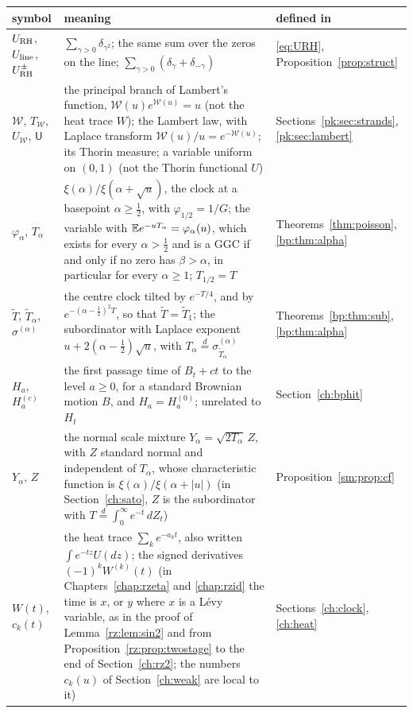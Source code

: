{\small
\begin{longtable}{@{}p{}p{}p{}@{}}
\toprule
symbol & meaning & defined in\\
\midrule
\endhead
$U_{\mathrm{RH}}$, $U_{\rm line}$, $U^\pm_{\mathrm{RH}}$ & \raggedright $\sum_{\gamma>0}\delta_{\gamma^2}$; the same sum over the zeros on the line; ${\sum_{\gamma>0}(\delta_\gamma+\delta_{-\gamma})}$ & \raggedright \eqref{eq:URH}, Proposition~\ref{prop:struct}\tabularnewline
$\mathcal W$, $T_{\mathcal W}$, $U_{\mathcal W}$, $\mathsf U$ & \raggedright the principal branch of Lambert's function, ${\mathcal W(u)e^{\mathcal W(u)}=u}$ (not the heat trace $W$); the Lambert law, with Laplace transform ${\mathcal W(u)/u=e^{-\mathcal W(u)}}$; its Thorin measure; a variable uniform on $(0,1)$ (not the Thorin functional $U$) & \raggedright Sections~\ref{pk:sec:strands}, \ref{pk:sec:lambert}\tabularnewline
$\varphi_\alpha$, $T_\alpha$ & \raggedright $\xi(\alpha)/\xi(\alpha+\sqrt u)$, the clock at a basepoint $\alpha\ge\frac12$, with ${\varphi_{1/2}=1/G}$; the variable with ${\mathbb{E} e^{-uT_\alpha}=\varphi_\alpha(u)}$, which exists for every $\alpha>\frac12$ and is a GGC if and only if no zero has $\beta>\alpha$, in particular for every $\alpha\ge1$; ${T_{1/2}=T}$ & \raggedright Theorems~\ref{thm:poisson}, \ref{bp:thm:alpha}\tabularnewline
$\widetilde T$, $\widetilde T_\alpha$, $\sigma^{(\alpha)}$ & \raggedright the centre clock tilted by $e^{-T/4}$, and by $e^{-(\alpha-\frac12)^2T}$, so that ${\widetilde T=\widetilde T_1}$; the subordinator with Laplace exponent ${u+2(\alpha-\frac12)\sqrt u}$, with ${T_\alpha\stackrel d=\sigma^{(\alpha)}_{\widetilde T_\alpha}}$ & \raggedright Theorems~\ref{bp:thm:sub}, \ref{bp:thm:alpha}\tabularnewline
$H_a$, $H^{(c)}_a$ & \raggedright the first passage time of $B_t+ct$ to the level $a\ge0$, for a standard Brownian motion $B$, and ${H_a=H^{(0)}_a}$; unrelated to $H_t$ & \raggedright Section~\ref{ch:bphit}\tabularnewline
$Y_\alpha$, $Z$ & \raggedright the normal scale mixture ${Y_\alpha=\sqrt{2T_\alpha}\,Z}$, with $Z$ standard normal and independent of $T_\alpha$, whose characteristic function is ${\xi(\alpha)/\xi(\alpha+|u|)}$ (in Section~\ref{ch:sato}, $Z$ is the subordinator with ${T\stackrel d=\int_0^\infty e^{-t}\,dZ_t}$) & \raggedright Proposition~\ref{sm:prop:cf}\tabularnewline
$W(t)$, $c_k(t)$ & \raggedright the heat trace $\sum_ke^{-a_kt}$, also written $\int e^{-tz}U(dz)$; the signed derivatives $(-1)^kW^{(k)}(t)$ (in Chapters~\ref{chap:rzeta} and \ref{chap:rzid} the time is $x$, or $y$ where $x$ is a L\'evy variable, as in the proof of Lemma~\ref{rz:lem:sin2} and from Proposition~\ref{rz:prop:twostage} to the end of Section~\ref{ch:rz2}; the numbers $c_k(u)$ of Section~\ref{ch:weak} are local to it) & \raggedright Sections~\ref{ch:clock}, \ref{ch:heat}\tabularnewline

\end{longtable}}
